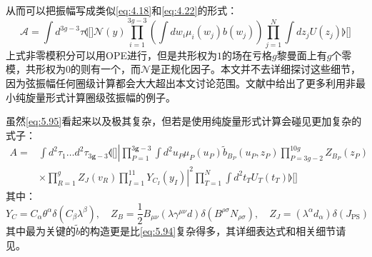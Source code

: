 从而可以把振幅写成类似\ref{eq:4.18}和\ref{eq:4.22}的形式：
\begin{equation}
	\label{eq:5.95}
	\mathcal{A}=\int d^{3g-3}\tau\llangle[\Bigg]\mathcal{N}(y)\prod_{i=1}^{3g-3}(\int dw_i\mu_i(w_j)b(w_j))\prod_{j=1}^N\int dz_jU(z_j)\rrangle[\Bigg]
\end{equation}
上式非零模积分可以用OPE进行，但是共形权为$1$的场在亏格$g$黎曼面上有$g$个零模，共形权为$0$的则有一个，而$\mathcal{N}$是正规化因子。本文并不去详细探讨这些细节，因为弦振幅任何圈级计算都会大大超出本文讨论范围。文献\cite{Berkovits:2006bk}中给出了更多利用非最小纯旋量形式计算圈级弦振幅的例子。

虽然\ref{eq:5.95}看起来以及极其复杂，但若是使用纯旋量形式计算会碰见更加复杂的式子：
\begin{equation}
\begin{aligned}
		A=&\int d^2\tau_1\ldots d^2\tau_{3\boldsymbol{g}-3}\llangle[\Bigg]\left|\prod_{P=1}^{3\boldsymbol{g}-3}\int d^2u_P\mu_P(u_P)\tilde{b}_{B_P}(u_P,z_P)\prod_{P=3g-2}^{10g}Z_{B_P}(z_P)\right.\\
	&\times\left.\prod_{R=1}^gZ_J(v_R)\prod_{I=1}^{11}Y_{C_I}(y_I)\right|^2\prod_{T=1}^N\int d^2t_TU_T(t_T)\rrangle[\Bigg]
\end{aligned}
\end{equation}
其中：
\begin{equation}
	Y_C = C_\alpha \theta^\alpha \delta(C_\beta \lambda^\beta), \quad 
	Z_B = \frac{1}{2} B_{\mu\nu} (\lambda \gamma^{\mu\nu} d) \delta(B^{\rho\sigma} N_{\rho\sigma}), \quad 
	Z_J = (\lambda^\alpha d_\alpha) \delta(J_{\text{PS}})
\end{equation}
其中最为关键的$\tilde{b}$的构造更是比\ref{eq:5.94}复杂得多，其详细表达式和相关细节请见\cite{Berkovits:2004px,Oda:2005sd,Oda:2004bg}。